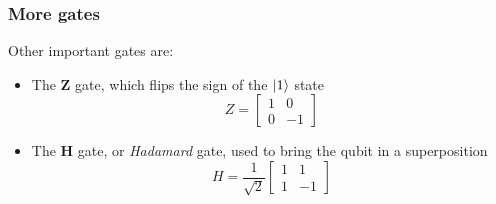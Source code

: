 \documentclass{beamer}
\begin{document}
  \begin{frame}
    \frametitle{More gates}
    Other important gates are:
    \begin{itemize}
      \item The \textbf{Z} gate, which flips the sign of the $\ket{1}$ state
      \begin{equation*}
        Z = \begin{bmatrix}
          1 & 0 \\ 0 & -1
        \end{bmatrix}
      \end{equation*}
      \item The \textbf{H} gate, or \textit{Hadamard} gate, used to bring the qubit in a superposition
      \begin{equation*}
        H = \frac1{\sqrt 2}\begin{bmatrix}
          1 & 1 \\ 1 & -1
        \end{bmatrix}
      \end{equation*}
    \end{itemize}  
  \end{frame}
\end{document}
